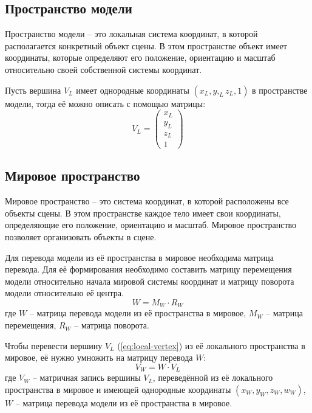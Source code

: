 \subsection{Пространство модели}

Пространство модели -- это локальная система координат, в которой располагается конкретный объект сцены. В этом пространстве объект имеет координаты, которые определяют его положение, ориентацию и масштаб относительно своей собственной системы координат. 

Пусть вершина $V_L$ имеет однородные координаты $(x_L, y,_L z_L, 1)$ в пространстве модели, тогда её можно описать с помощью матрицы:
\begin{equation}
	V_L = 
	\begin{pmatrix}
		x_L \\
		y_L \\
		z_L \\
		1
	\end{pmatrix}
	\label{eq:local-vertex}
\end{equation}

\subsection{Мировое пространство}

Мировое пространство -- это система координат, в которой расположены все объекты сцены. В этом пространстве каждое тело имеет свои координаты, определяющие его положение, ориентацию и масштаб. Мировое пространство позволяет организовать объекты в сцене.

Для перевода модели из её пространства в мировое необходима матрица перевода. Для её формирования необходимо составить матрицу перемещения модели относительно начала мировой системы координат и матрицу поворота модели относительно её центра.
\begin{equation}
	W = M_W \cdot R_W
\end{equation}
где $W$ -- матрица перевода модели из её пространства в мировое, $M_W$ -- матрица перемещения, $R_W$ -- матрица поворота.

Чтобы перевести вершину $V_L$ (\ref{eq:local-vertex}) из её локального пространства в мировое, её нужно умножить на матрицу перевода $W$:
\begin{equation}
	V_W = W \cdot V_L
	\label{eq:world-vertex}
\end{equation}
где $V_W$ -- матричная запись вершины $V_L$, переведённой из её локального пространства в мировое и имеющей однородные координаты $(x_W, y_W, z_W, w_W)$, $W$ -- матрица перевода модели из её пространства в мировое.

